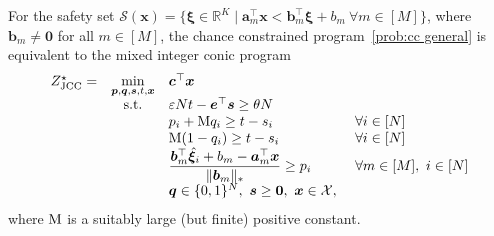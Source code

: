 \documentclass[nonblindrev]{informs2017}
\newcommand{\bmh}[1]{\hat{\bm{#1}}}
\newcommand{\1}[1]{\mathds{1}{\left(#1\right)}}
\begin{document}
\begin{proposition}\label{prop:joint cc}
For the safety set $\mathcal{S}(\bm{x}) = \{\bm{\xi} \in \mathbb{R}^K \mid \bm{a}^\top_m \bm{x} < \bm{b}^\top_m\bm{\xi} + b_m ~\forall m \in [M]\}$, where $\bm{b}_m \ne \bm{0}$ for all $m \in [M]$, the chance constrained program~\eqref{prob:cc general} is equivalent to the mixed integer conic program
\begin{equation}
\label{prob:joint cc reformulation M linearization}
\begin{array}{rcll}
Z^\star_{\rm JCC} =& \displaystyle \min_{\bm{p}, \bm{q}, \bm{s}, t, \bm{x}} & \bm{c}^\top\bm{x} \\
&{\rm s.t.} & \varepsilon N t - \bm{e}^\top\bm{s} \geq \theta N \\
&& p_i + {\rm M} q_i \geq t - s_i &~\forall i \in [N] \\
&& {\rm M} (1 - q_i) \geq t - s_i &~\forall i \in [N] \\
&& \dfrac{\bm{b}^\top_m\bmh{\xi}_i + b_m - \bm{a}^\top_m\bm{x}}{\|\bm{b}_m\|_*} \geq p_i &~\forall m \in [M], ~i \in [N] \\
&& \bm{q} \in \{0,1\}^N,~ \bm{s} \geq \bm{0}, ~\bm{x} \in \mathcal{X},
\end{array}
\end{equation}
where ${\rm M}$ is a suitably large (but finite) positive constant.
\end{proposition}
\end{document}
